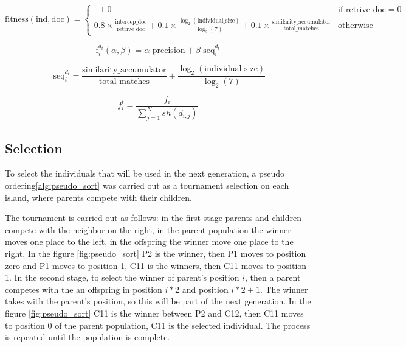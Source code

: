 \documentclass{IEEEtran}
\begin{document}
$$
  \text{fitness}(\text{ind}, \text{doc}) = \begin{cases}
    -1.0                                                                                                                                                                                                 & \text{if } \text{retrive\_doc} = 0 \\
    0.8 \times \frac{\text{intercep\_doc}}{\text{retrive\_doc}} + 0.1 \times \frac{\log_2(\text{individual\_size})}{\log_2(7)} + 0.1 \times \frac{\text{similarity\_accumulator}}{\text{total\_matches}} & \text{otherwise}
  \end{cases}
$$

$$
  \text{f}^{d_{t}}_{i}(\alpha,\beta) =
  \alpha \text{ precision} + \beta \text{ seq}^{d_{t}}_{i}
$$

$$
  \text{ seq}^{d_{t}}_{i} = \frac{\text{similarity\_accumulator}}{\text{total\_matches}} + \frac{\log_2(\text{individual\_size})}{\log_2(7)}
$$


\begin{equation}
  \label{shared_eq_ind}
  f^t_i = \frac{f_i}{\sum_{j=1}^N sh(d_{i,j})}
\end{equation}

\subsection{Selection}

To select the individuals that will be used in the next generation, a pseudo ordering\ref{alg:pseudo_sort} was carried out as a tournament selection on each island, where parents compete with their children.

The tournament is carried out as follows: in the first stage parents and children compete with the neighbor on the right, in the parent population the winner moves one place to the left, in the offspring the winner move one place to the right. In the figure \ref{fig:pseudo_sort} P2 is the winner, then P1 moves to position zero and P1 moves to position 1, C11 is the winners, then C11 moves to position 1. In the second stage, to select the winner of parent's position $i$, then a parent competes  with the an offspring in position $i * 2$ and position $i * 2 + 1$. The winner takes with the parent's position, so this will be part of the next generation. In the figure \ref{fig:pseudo_sort} C11 is the winner between P2 and C12, then C11 moves to position 0 of the parent population, C11 is the selected individual. The process is repeated until the population is complete.
\end{document}

